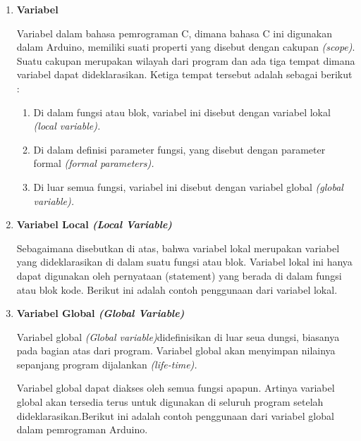 \begin{enumerate}
\begin{enumerate}
    
\end{enumerate}
\item \textbf{Variabel}
\par Variabel dalam bahasa pemrograman C, dimana bahasa C ini digunakan dalam Arduino, memiliki suati properti yang disebut dengan cakupan \textit{(scope)}. Suatu cakupan merupakan wilayah dari program dan ada tiga tempat dimana variabel dapat dideklarasikan. Ketiga tempat tersebut adalah sebagai berikut :
\begin{enumerate}
    \item Di dalam fungsi atau blok, variabel ini disebut dengan variabel lokal \textit{(local variable).}
    \item Di dalam definisi parameter fungsi, yang disebut dengan parameter formal \textit{(formal parameters).}
    \item Di luar semua fungsi, variabel ini disebut dengan variabel global \textit{(global variable).}
\end{enumerate}
\item \textbf{Variabel Local \textit{ (Local Variable)}}
\par Sebagaimana disebutkan di atas, bahwa variabel lokal merupakan variabel yang dideklarasikan di dalam suatu fungsi atau blok. Variabel lokal ini hanya dapat digunakan oleh pernyataan (statement) yang berada di dalam fungsi atau blok kode. Berikut ini adalah contoh penggunaan dari variabel lokal.


\item \textbf{Variabel Global \textit{(Global Variable)}}
\par Variabel global \textit{(Global variable)}didefinisikan di luar seua dungsi, biasanya pada bagian atas dari program. Variabel global akan menyimpan nilainya sepanjang program dijalankan \textit{ (life-time).}


\par Variabel global dapat diakses oleh semua fungsi apapun. Artinya variabel global akan tersedia terus untuk digunakan di seluruh program setelah dideklarasikan.Berikut ini adalah contoh penggunaan dari variabel global dalam pemrograman Arduino.


\end{enumerate}

